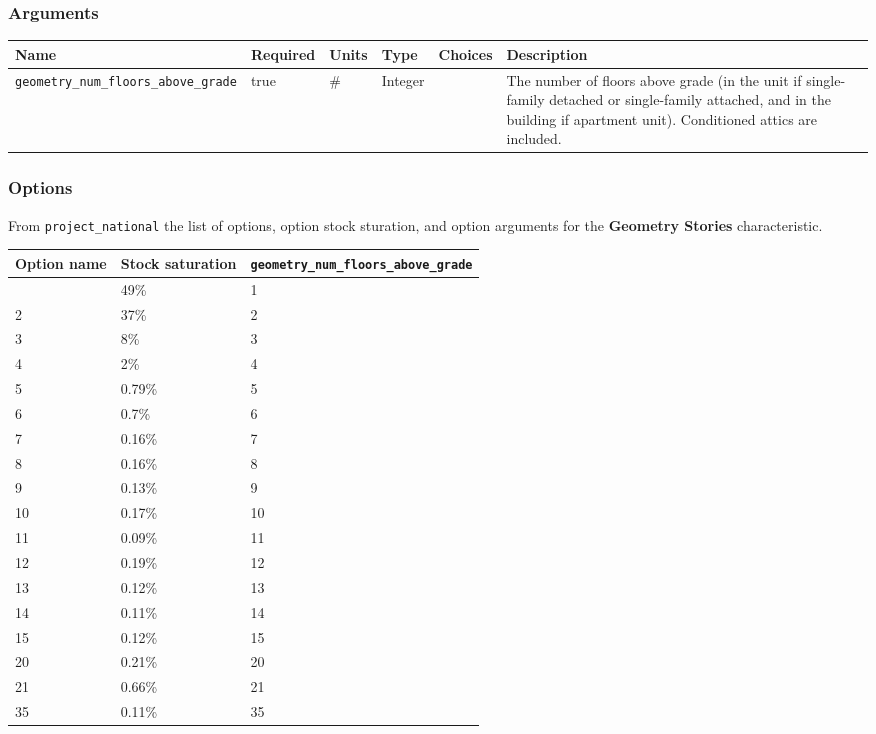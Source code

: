 \subsubsection{Arguments}\label{arguments-37}

\begin{longtable}[]{@{}llllll@{}}
\toprule\noalign{}
Name & Required & Units & Type & Choices & Description \\
\midrule\noalign{}
\endhead
\bottomrule\noalign{}
\endlastfoot
\texttt{geometry\_num\_floors\_above\_grade} & true & \# & Integer & &
The number of floors above grade (in the unit if single-family detached
or single-family attached, and in the building if apartment unit).
Conditioned attics are included. \\
\end{longtable}

\subsubsection{Options}\label{options-57}

From \texttt{project\_national} the list of options, option stock
sturation, and option arguments for the \textbf{Geometry Stories}
characteristic.

\begin{longtable}[]{@{}lll@{}}
\toprule\noalign{}
Option name & Stock saturation &
\texttt{geometry\_num\_floors\_above\_grade} \\
\midrule\noalign{}
\endhead
\bottomrule\noalign{}
\endlastfoot
1 & 49\% & 1 \\
2 & 37\% & 2 \\
3 & 8\% & 3 \\
4 & 2\% & 4 \\
5 & 0.79\% & 5 \\
6 & 0.7\% & 6 \\
7 & 0.16\% & 7 \\
8 & 0.16\% & 8 \\
9 & 0.13\% & 9 \\
10 & 0.17\% & 10 \\
11 & 0.09\% & 11 \\
12 & 0.19\% & 12 \\
13 & 0.12\% & 13 \\
14 & 0.11\% & 14 \\
15 & 0.12\% & 15 \\
20 & 0.21\% & 20 \\
21 & 0.66\% & 21 \\
35 & 0.11\% & 35 \\
\end{longtable}

